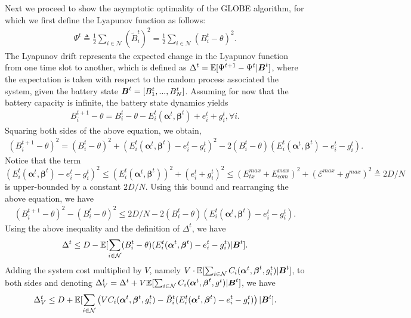 \documentclass[12pt, draftclsnofoot, letterpaper, onecolumn]{IEEEtran}
\begin{document}
{Next we proceed to show the asymptotic optimality of the GLOBE algorithm, for which we first define the Lyapunov function as follows:
\begin{align}
\Psi^t \triangleq\frac{1}{2}\sum_{i\in\mathcal{N}}(\tilde{B}^t_i)^2=\frac{1}{2}\sum_{i\in\mathcal{N}}\left(B^t_i - \theta\right)^2.
\end{align}
The Lyapunov drift represents the expected change in the Lyapunov function from one time slot to another, which is defined as $\Delta^t = \mathbb{E}[\Psi^{t+1} - \Psi^t|{\boldsymbol{B}}^t]$, where the expectation is taken with respect to the random process associated the system, given the battery state ${\boldsymbol{B}}^t=[B^t_1,...,B^t_N]$. Assuming for now that the battery capacity is infinite, the battery state dynamics yields
\begin{align}
B^{t+1}_i - \theta = B^t_i - \theta - E^t_i(\bm\alpha^t, \bm\beta^t) + e^t_i + g^t_i, \forall i.
\end{align}
Squaring both sides of the above equation, we obtain,
\begin{align}
(B^{t+1}_i - \theta)^2 = (B^t_i - \theta)^2 + (E_i^t(\bm\alpha^t, \bm{\beta}^t) - e^t_i - g^t_i)^2  - 2(B^t_i - \theta)(E_i^t(\bm\alpha^t, \bm{\beta}^t) - e^t_i - g^t_i).
\end{align}
Notice that the term $(E_i^t(\bm\alpha^t, \bm{\beta}^t) - e^t_i - g^t_i)^2 \leq (E_i^t(\bm\alpha^t, \bm{\beta}^t))^2 + (e^t_i + g^t_i)^2 \leq (E_{tx}^{max} + E_{com}^{max})^2 + (\mathcal{E}^{max} + g^{max})^2 \triangleq 2D/N$ is upper-bounded by a constant $2D/N$. Using this bound and rearranging the above equation, we have
\begin{align}
(B^{t+1}_i - \theta)^2 - (B^t_i - \theta)^2
\leq 2D/N - 2(B^t_i - \theta)(E_i^t(\bm\alpha^t, \bm{\beta}^t) - e^t_i - g^t_i).
\end{align}
Using the above inequality and the definition of $\Delta^t$, we have
\begin{align}
\Delta^t \leq D - \mathbb{E}[\sum_{i\in\mathcal{N}}(B^t_i - \theta)(E_i^t(\mbox{\boldmath $\alpha$}^t, \mbox{\boldmath $\beta$}^t) - e^t_i - g^t_i)|{\boldsymbol{B}}^t].
\end{align}
Adding the system cost multiplied by $V$, namely $V\cdot\mathbb{E}[\sum_{i\in\mathcal{N}} C_i(\mbox{\boldmath $\alpha$}^t, \mbox{\boldmath $\beta$}^t, g^t_i)|{\boldsymbol{B}}^t]$, to both sides and denoting $\Delta_V^t = \Delta^t + V\mathbb{E}[\sum_{i\in\mathcal{N}} C_i(\mbox{\boldmath $\alpha$}^t, \mbox{\boldmath $\beta$}^t, g^t)|{\boldsymbol{B}}^t]$, we have
\begin{align}
\Delta_V^t \leq D + \mathbb{E}[\sum_{i\in\mathcal{N}}\left(V C_i(\mbox{\boldmath $\alpha$}^t, \mbox{\boldmath $\beta$}^t, g^t_i) - \tilde{B}^t_i (E_i^t(\mbox{\boldmath $\alpha$}^t, \mbox{\boldmath $\beta$}^t) - e^t_i -g^t_i) \right)|{\boldsymbol{B}}^t].  \label{bound}
\end{align}

}
\end{document}
